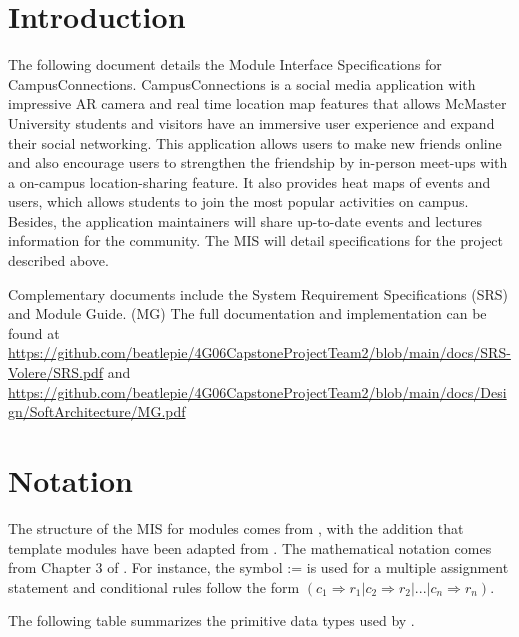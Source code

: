 \documentclass[12pt, titlepage]{article}
\begin{document}
\newpage

\tableofcontents

\newpage


\section{Introduction}

The following document details the Module Interface Specifications for CampusConnections. CampusConnections is a social media application with impressive AR camera and real time location map features that allows McMaster University students and visitors have an immersive user experience and expand their social networking. This application allows users to make new friends online and also encourage users to strengthen the friendship by in-person meet-ups with a on-campus location-sharing feature. It also provides heat maps of events and users, which allows students to join the most popular activities on campus. Besides, the application maintainers will share up-to-date events and lectures information for the community. The MIS will detail specifications for the project described above.

Complementary documents include the System Requirement Specifications (SRS)
and Module Guide. (MG)  The full documentation and implementation can be
found at \url{https://github.com/beatlepie/4G06CapstoneProjectTeam2/blob/main/docs/SRS-Volere/SRS.pdf} and \url{https://github.com/beatlepie/4G06CapstoneProjectTeam2/blob/main/docs/Design/SoftArchitecture/MG.pdf}

\section{Notation}
The structure of the MIS for modules comes from \citet{HoffmanAndStrooper1995},
with the addition that template modules have been adapted from
\cite{GhezziEtAl2003}.  The mathematical notation comes from Chapter 3 of
\citet{HoffmanAndStrooper1995}.  For instance, the symbol := is used for a
multiple assignment statement and conditional rules follow the form $(c_1
\Rightarrow r_1 | c_2 \Rightarrow r_2 | ... | c_n \Rightarrow r_n )$.

The following table summarizes the primitive data types used by \progname. 
\end{document}
